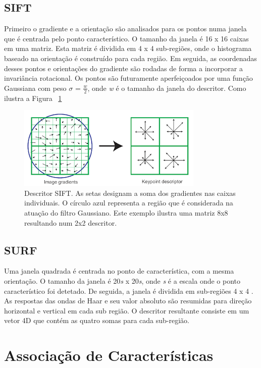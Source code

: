 \subsection{SIFT}

Primeiro o gradiente e a orientação são analisados para os pontos numa janela que é centrada pelo ponto característico. O tamanho da janela é 16 x 16 caixas em uma matriz. Esta matriz é dividida em 4 x 4 sub-regiões, onde o histograma baseado na orientação é construído para cada região. Em seguida, as coordenadas desses pontos e orientações do gradiente são rodadas de forma a incorporar a invariância rotacional. Os pontos são futuramente aperfeiçoados por uma função Gaussiana com peso $\sigma$ = $\frac{w}{2}$, onde \textit{w} é o tamanho da janela do descritor. Como ilustra a Figura ~\ref{fig:siftdescriptor}

\begin{figure}[h!]
	\centering
	\includegraphics[width=0.7\linewidth]{figures/SIFTdescriptor}
	\caption{Descritor SIFT. As setas designam a soma dos gradientes nas caixas individuais. O círculo azul representa a região que é considerada na atuação do filtro Gaussiano. Este exemplo ilustra uma matriz 8x8 resultando num 2x2 descritor. \cite{VisualOdometryRodasVehicles}}
	\label{fig:siftdescriptor}
\end{figure}

\subsection{SURF}

Uma janela quadrada é centrada no ponto de característica, com a mesma orientação. O tamanho da janela é 20\textit{s} x 20\textit{s}, onde \textit{s} é a escala onde o ponto característico foi detetado. De seguida, a janela é dividida em sub-regiões 4 x 4 . As respostas das ondas de Haar e seu valor absoluto são resumidas para direção horizontal e vertical em cada sub região. O descritor resultante consiste em um vetor 4D que contém as quatro somas para cada sub-região.


\section{Associação de Características}

